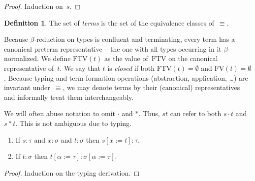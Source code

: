 \documentclass[a4paper,UKenglish,cleveref,autoref,numberwithinsect]{lipics-v2019}
\theoremstyle{definition}
\newtheorem{defn}[theorem]{Definition}
\newcommand{\app}[2]{#1 \cdot #2}
\newcommand{\tapp}[2]{#1 * #2}
\newcommand{\subst}[2]{#1:=#2}
\newcommand{\FTV}{\mathrm{FTV}}
\newcommand{\FV}{\mathrm{FV}}
\begin{document}
\begin{proof}
  Induction on~$s$.
\end{proof}

\begin{defn}\label{def_terms}
  The set of \emph{terms} is the set of the equivalence classes
  of~$\equiv$.
\end{defn}

Because $\beta$-reduction on types is confluent and terminating, every
term has a canonical preterm representative -- the one with all types
occurring in it $\beta$-normalized.
We define $\FTV(t)$
as the value of~$\FTV$ on the canonical representative of~$t$.
We say that $t$ is \emph{closed} if both $\FTV(t) = \emptyset$
and $\FV(t) = \emptyset$.
%
Because typing and term formation operations (abstraction,
application, \ldots) are invariant under~$\equiv$, we may denote terms
by their (canonical) representatives and informally treat them
interchangeably.

We will often abuse notation to omit $\cdot$ and $*$. Thus, $s t$ can
refer to both $\app{s}{t}$ and $\tapp{s}{t}$. This is not ambiguous
due to typing.

\begin{lemma}\label{lem:substitution}
  \begin{enumerate}
  \item If $s : \tau$ and $x : \sigma$ and $t : \sigma$ then
    $s[\subst{x}{t}] : \tau$.
  \item If $t : \sigma$ then
    $t[\subst{\alpha}{\tau}] : \sigma[\subst{\alpha}{\tau}]$.
  \end{enumerate}
\end{lemma}

\begin{proof}
  Induction on the typing derivation.
\end{proof}
\end{document}
